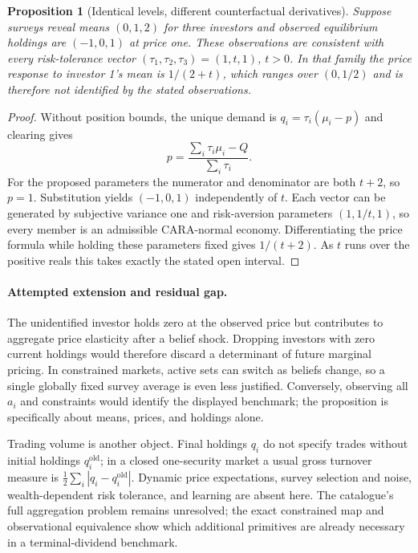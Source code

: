 \documentclass[11pt]{article}
\newtheorem{proposition}[theorem]{Proposition}
\theoremstyle{definition}
\begin{document}
\begin{proposition}[Identical levels, different counterfactual derivatives]
Suppose surveys reveal means $(0,1,2)$ for three investors and observed equilibrium holdings are $(-1,0,1)$ at price one. These observations are consistent with every risk-tolerance vector $(\tau_1,\tau_2,\tau_3)=(1,t,1)$, $t>0$. In that family the price response to investor 1's mean is $1/(2+t)$, which ranges over $(0,1/2)$ and is therefore not identified by the stated observations.
\end{proposition}
\begin{proof}
Without position bounds, the unique demand is $q_i=\tau_i(\mu_i-p)$ and clearing gives
\[
 p=\frac{\sum_i\tau_i\mu_i-Q}{\sum_i\tau_i}.
\]
For the proposed parameters the numerator and denominator are both $t+2$, so $p=1$. Substitution yields $(-1,0,1)$ independently of $t$. Each vector can be generated by subjective variance one and risk-aversion parameters $(1,1/t,1)$, so every member is an admissible CARA-normal economy. Differentiating the price formula while holding these parameters fixed gives $1/(t+2)$. As $t$ runs over the positive reals this takes exactly the stated open interval.
\end{proof}

\paragraph{Attempted extension and residual gap.}
The unidentified investor holds zero at the observed price but contributes to aggregate price elasticity after a belief shock. Dropping investors with zero current holdings would therefore discard a determinant of future marginal pricing. In constrained markets, active sets can switch as beliefs change, so a single globally fixed survey average is even less justified. Conversely, observing all $a_i$ and constraints would identify the displayed benchmark; the proposition is specifically about means, prices, and holdings alone.

Trading volume is another object. Final holdings $q_i$ do not specify trades without initial holdings $q_i^{\mathrm{old}}$; in a closed one-security market a usual gross turnover measure is $\frac12\sum_i|q_i-q_i^{\mathrm{old}}|$. Dynamic price expectations, survey selection and noise, wealth-dependent risk tolerance, and learning are absent here. The catalogue's full aggregation problem remains unresolved; the exact constrained map and observational equivalence show which additional primitives are already necessary in a terminal-dividend benchmark.
\end{document}
